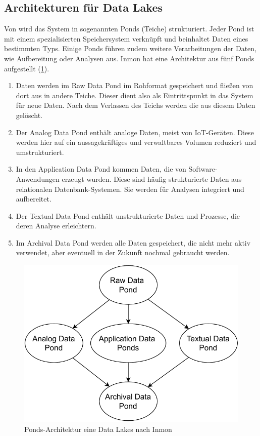 \subsection{Architekturen für Data Lakes}
Von \textcite{inmon2016data} wird das System in sogenannten Ponds (Teiche) strukturiert.
Jeder Pond ist mit einem spezialisierten Speichersystem verknüpft und beinhaltet Daten eines bestimmten Typs.
Einige Ponds führen zudem weitere Verarbeitungen der Daten, wie Aufbereitung oder Analysen aus.
Inmon hat eine Architektur aus fünf Ponds aufgestellt (\cref{fig:datalake-ponds}).
\begin{enumerate}
    \item Daten werden im Raw Data Pond im Rohformat gespeichert und fließen von dort aus in andere Teiche.
    Dieser dient also als Eintrittspunkt in das System für neue Daten.
    Nach dem Verlassen des Teichs werden die aus diesem Daten gelöscht.
    \item Der Analog Data Pond enthält analoge Daten, meist von IoT-Geräten.
    Diese werden hier auf ein aussagekräftiges und verwaltbares Volumen reduziert und umstrukturiert.
    \item In den Application Data Pond kommen Daten, die von Software-Anwendungen erzeugt wurden.
    Diese sind häufig strukturierte Daten aus relationalen Datenbank-Systemen.
    Sie werden für Analysen integriert und aufbereitet.
    \item Der Textual Data Pond enthält unstrukturierte Daten und Prozesse, die deren Analyse erleichtern.
    \item Im Archival Data Pond werden alle Daten gespeichert, die nicht mehr aktiv verwendet, aber eventuell in der Zukunft nochmal gebraucht werden.
\end{enumerate}
\begin{figure}
    \centering
    \includegraphics[width=.8\textwidth]{Grafiken/Grundlagen-Ponds.pdf}
    \caption{Ponds-Architektur eine Data Lakes nach Inmon}
    \label{fig:datalake-ponds}
\end{figure}

